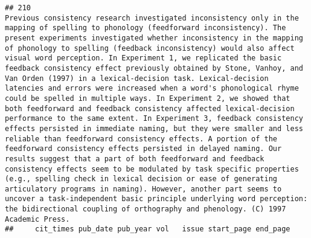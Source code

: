 \documentclass[
  english,
  man]{apa6}
\begin{document}
\begin{verbatim}
## 210                                                                                                                                                                                                                                                                                                                                                                                                                                                                                                                                                                                                                                                                                                                                                                                                                                                                                                                                                                                                                                                                                                                                                                                                                                                               Previous consistency research investigated inconsistency only in the mapping of spelling to phonology (feedforward inconsistency). The present experiments investigated whether inconsistency in the mapping of phonology to spelling (feedback inconsistency) would also affect visual word perception. In Experiment 1, we replicated the basic feedback consistency effect previously obtained by Stone, Vanhoy, and Van Orden (1997) in a lexical-decision task. Lexical-decision latencies and errors were increased when a word's phonological rhyme could be spelled in multiple ways. In Experiment 2, we showed that both feedforward and feedback consistency affected lexical-decision performance to the same extent. In Experiment 3, feedback consistency effects persisted in immediate naming, but they were smaller and less reliable than feedforward consistency effects. A portion of the feedforward consistency effects persisted in delayed naming. Our results suggest that a part of both feedforward and feedback consistency effects seem to be modulated by task specific properties (e.g., spelling check in lexical decision or ease of generating articulatory programs in naming). However, another part seems to uncover a task-independent basic principle underlying word perception: the bidirectional coupling of orthography and phenology. (C) 1997 Academic Press.
##     cit_times pub_date pub_year vol   issue start_page end_page

\end{verbatim}
\end{document}
